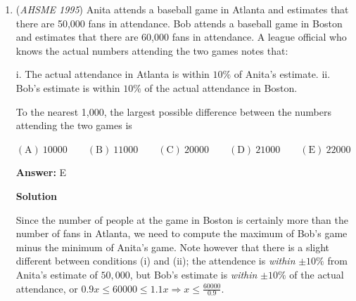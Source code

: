 \begin{enumerate}
$\mathrm{(A) \ 1 } \qquad \mathrm{(B) \ 2 } \qquad \mathrm{(C) \ 3 } \qquad \mathrm{(D) \ 4 } \qquad \mathrm{(E) \ 5 }$

 \textbf{Answer: }D



\textbf{Solution}

Let us see how the bug moves.

 First, we see that if it starts at point 5, it moves to point 1.

 At point 1, it moves to point 2.

 At point 2, since 2 is even, it moves to point 4.

 Then at point 4, it moves to point 1.

 We can see that at this point, the bug will cycle between 1, 2, and 4

 More specifically, we can see that all numbers congruent to 0 (mod 3) will have the bug on point 4 on that step number.

 Thus, we can conclude that the answer is $\fbox{\text{(D)}}$



	\item (\textit{AHSME 1995}) Anita attends a baseball game in Atlanta and estimates that there are 50,000 fans in attendance. Bob attends a baseball game in Boston and estimates that there are 60,000 fans in attendance. A league official who knows the actual numbers attending the two games notes that:


 i. The actual attendance in Atlanta is within $10 \%$ of Anita's estimate.
ii. Bob's estimate is within $10 \%$ of the actual attendance in Boston.


 To the nearest 1,000, the largest possible difference between the numbers attending the two games is


 $\mathrm{(A) \ 10000 } \qquad \mathrm{(B) \ 11000 } \qquad \mathrm{(C) \ 20000 } \qquad \mathrm{(D) \ 21000 } \qquad \mathrm{(E) \ 22000 }$

 \textbf{Answer: }E



\textbf{Solution}

Since the number of people at the game in Boston is certainly more than the number of fans in Atlanta, we need to compute the maximum of Bob's game minus the minimum of Anita's game. Note however that there is a slight different between conditions (i) and (ii); the attendence is \textit{within} $\pm 10 \%$ from Anita's estimate of $50,000$, but Bob's estimate is \textit{within} $\pm 10 \%$ of the actual attendance, or $0.9x \le 60000 \le 1.1x \Longrightarrow x \le \frac{60000}{0.9}$. 


\end{enumerate}
